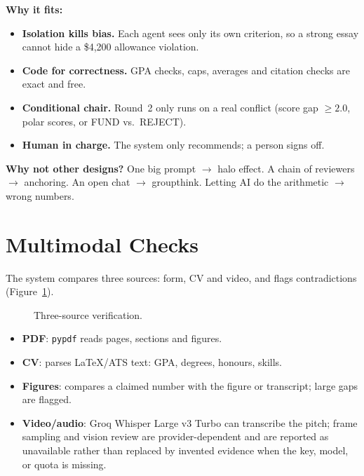 \documentclass[11pt,a4paper]{article}
\begin{document}
\textbf{Why it fits:}
\begin{itemize}
  \item \textbf{Isolation kills bias.} Each agent sees only its own criterion, so a strong essay cannot hide a \$4{,}200 allowance violation.
  \item \textbf{Code for correctness.} GPA checks, caps, averages and citation checks are exact and free.
  \item \textbf{Conditional chair.} Round~2 only runs on a real conflict (score gap $\ge 2.0$, polar scores, or FUND vs.\ REJECT).
  \item \textbf{Human in charge.} The system only recommends; a person signs off.
\end{itemize}

\textbf{Why not other designs?} One big prompt $\rightarrow$ halo effect. A chain of reviewers $\rightarrow$ anchoring. An open chat $\rightarrow$ groupthink. Letting AI do the arithmetic $\rightarrow$ wrong numbers.

\section{Multimodal Checks}
The system compares three sources: form, CV and video, and flags contradictions (Figure~\ref{fig:multi}).

\begin{figure}[h]
\centering
{}
\caption{Three-source verification.}
\label{fig:multi}
\end{figure}

\begin{itemize}
  \item \textbf{PDF}: \texttt{pypdf} reads pages, sections and figures.
  \item \textbf{CV}: parses LaTeX/ATS text: GPA, degrees, honours, skills.
  \item \textbf{Figures}: compares a claimed number with the figure or transcript; large gaps are flagged.
  \item \textbf{Video/audio}: Groq Whisper Large v3 Turbo can transcribe the pitch; frame sampling and vision review are provider-dependent and are reported as unavailable rather than replaced by invented evidence when the key, model, or quota is missing.
\end{itemize}
\end{document}
